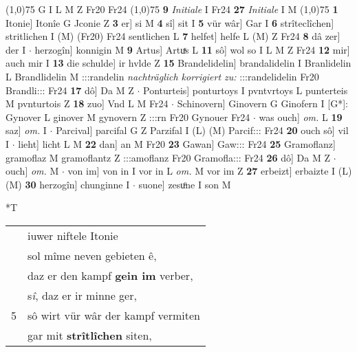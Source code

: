 \documentclass[8pt,a4paper,notitlepage]{article}
\begin{document}
\begin{table}[ht]
\begin{minipage}[t]{0.5\linewidth}
\begin{tabular}{rl}
\end{tabular}
\scriptsize
\line(1,0){75} \newline
G I L M Z Fr20 Fr24 \newline
\line(1,0){75} \newline
\textbf{9} \textit{Initiale} I Fr24  \textbf{27} \textit{Initiale} I M  \newline
\line(1,0){75} \newline
\textbf{1} Itonie] Itonîe G Jconie Z \textbf{3} er] si M \textbf{4} sî] sit I \textbf{5} vür wâr] Gar I \textbf{6} strîteclîchen] stritlichen I (M) (Fr20) Fr24 sentlichen L \textbf{7} helfet] helfe L (M) Z Fr24 \textbf{8} dâ zer] der I  $\cdot$ herzogîn] konnigin M \textbf{9} Artus] Artuͯs L \textbf{11} sô] wol so I L M Z Fr24 \textbf{12} mir] auch mir I \textbf{13} die schulde] ir hvlde Z \textbf{15} Brandelidelin] brandalidelin I Branlidelin L Brandlidelin M :::randelin \textit{nachträglich korrigiert zu:} :::randelidelin Fr20 Brandli::: Fr24 \textbf{17} dô] Da M Z  $\cdot$ Ponturteis] ponturtoys I pvntvrtoys L punterteis M pvnturtois Z \textbf{18} zuo] Vnd L M Fr24  $\cdot$ Schinovern] Ginovern G Ginofern I [G*]: Gynover L ginover M gynovern Z :::rn Fr20 Gynouer Fr24  $\cdot$ was ouch] \textit{om.} L \textbf{19} saz] \textit{om.} I  $\cdot$ Parcival] parcifal G Z Parzifal I (L) (M) Parcif::: Fr24 \textbf{20} ouch sô] vil I  $\cdot$ lieht] licht L M \textbf{22} dan] an M Fr20 \textbf{23} Gawan] Gaw::: Fr24 \textbf{25} Gramoflanz] gramoflaz M gramoflantz Z :::amoflanz Fr20 Gramofla::: Fr24 \textbf{26} dô] Da M Z  $\cdot$ ouch] \textit{om.} M  $\cdot$ von im] von in I vor in L \textit{om.} M vor im Z \textbf{27} erbeizt] erbaizte I (L) (M) \textbf{30} herzogîn] chunginne I  $\cdot$ suone] zesuͦne I son M \newline
\end{minipage}
\hspace{0.5cm}
\begin{minipage}[t]{0.5\linewidth}
\small
\begin{center}*T
\end{center}
\begin{tabular}{rl}
 & iuwer niftele Itonie\\ 
 & sol mîme neven gebieten ê,\\ 
 & daz er den kampf \textbf{gein im} verber,\\ 
 & s\textit{î}, daz er ir minne ger,\\ 
5 & sô wirt vür wâr der kampf vermiten\\ 
 & gar mit \textbf{strîtlîchen} siten,\\ 

\end{tabular}
\end{minipage}
\end{table}
\end{document}
